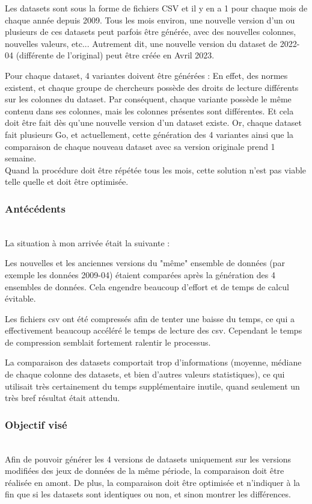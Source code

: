 Les datasets sont sous la forme de fichiers CSV et il y en a 1 pour chaque mois de chaque année depuis 2009.
Tous les mois environ, une nouvelle version d'un ou plusieurs de ces datasets peut parfois être générée, avec des nouvelles colonnes, nouvelles valeurs, etc...
Autrement dit, une nouvelle version du dataset de 2022-04 (différente de l'original) peut être créée en Avril 2023.

Pour chaque dataset, 4 variantes doivent être générées : En effet, des normes existent, et chaque groupe de chercheurs possède des droits de lecture différents sur les colonnes du dataset.
Par conséquent, chaque variante possède le même contenu dans ses colonnes, mais les colonnes présentes sont différentes.
Et cela doit être fait dès qu'une nouvelle version d'un dataset existe.
Or, chaque dataset fait plusieurs Go, et actuellement, cette génération des 4 variantes ainsi que la comparaison de chaque nouveau dataset avec sa version originale prend 1 semaine. 
\\

Quand la procédure doit être répétée tous les mois, cette solution n'est pas viable telle quelle et doit être optimisée.

\subsubsection{Antécédents}
~\\
La situation à mon arrivée était la suivante :

Les nouvelles et les anciennes versions du "même" ensemble de données (par exemple les données 2009-04) étaient comparées après la génération des 4 ensembles de données.
Cela engendre beaucoup d'effort et de temps de calcul évitable.

Les fichiers csv ont été compressés afin de tenter une baisse du temps, ce qui a effectivement beaucoup accéléré le temps de lecture des csv. 
Cependant le temps de compression semblait fortement ralentir le processus. 

La comparaison des datasets comportait trop d'informations (moyenne, médiane de chaque colonne des datasets, et bien d'autres valeurs statistiques), ce qui utilisait très certainement du temps supplémentaire inutile, quand seulement un très bref résultat était attendu.

\subsubsection{Objectif visé}
~\\
Afin de pouvoir générer les 4 versions de datasets uniquement sur les versions modifiées des jeux de données de la même période, la comparaison doit être réalisée en amont.
De plus, la comparaison doit être optimisée et n'indiquer à la fin que si les datasets sont identiques ou non, et sinon montrer les différences.


